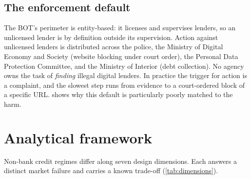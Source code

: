 \documentclass[11pt]{article}
\theoremstyle{plain}
\theoremstyle{definition}
\theoremstyle{remark}
\begin{document}
\subsection{The enforcement default}

The BOT's perimeter is entity-based: it licenses and supervises lenders, so an unlicensed lender is by definition outside its supervision. Action against unlicensed lenders is distributed across the police, the Ministry of Digital Economy and Society (website blocking under court order), the Personal Data Protection Committee, and the Ministry of Interior (debt collection). No agency owns the task of \emph{finding} illegal digital lenders. In practice the trigger for action is a complaint, and the slowest step runs from evidence to a court-ordered block of a specific URL.  shows why this default is particularly poorly matched to the harm.

\section{Analytical framework}\label{sec:framework}

Non-bank credit regimes differ along seven design dimensions. Each answers a distinct market failure and carries a known trade-off (\cref{tab:dimensions}).
\end{document}
